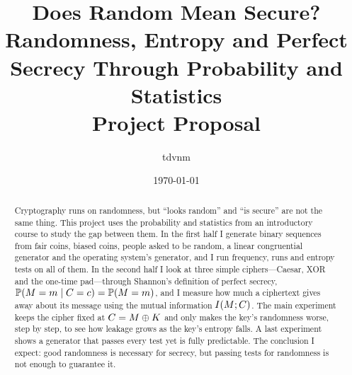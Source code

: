 \documentclass[11pt,a4paper]{article}
\title{Does Random Mean Secure?\\
\large Randomness, Entropy and Perfect Secrecy Through Probability and Statistics\\[0.5em]
\normalsize Project Proposal}
\author{tdvnm}
\date{\today}
\begin{document}
\maketitle

\begin{abstract}
Cryptography runs on randomness, but ``looks random'' and ``is secure'' are
not the same thing. This project uses the probability and statistics from an
introductory course to study the gap between them. In the first half I
generate binary sequences from fair coins, biased coins, people asked to be
random, a linear congruential generator and the operating system's
generator, and I run frequency, runs and entropy tests on all of them. In the second half I look at three simple ciphers---Caesar, XOR and the
one-time pad---through Shannon's definition of perfect secrecy,
$\mathbb{P}\!\left(M = m \mid C = c\right) = \mathbb{P}\!\left(M = m\right)$, and I measure how much a
ciphertext gives away about its message using the mutual information
$I\!\left(M ; C\right)$. The main experiment keeps the cipher fixed at
$C = M \oplus K$ and only makes the key's randomness worse, step by
step, to see how leakage grows as the key's entropy falls. A last experiment
shows a generator that passes every test yet is fully predictable. The
conclusion I expect: good randomness is necessary for secrecy, but passing
tests for randomness is not enough to guarantee it.
\end{abstract}

\setcounter{tocdepth}{1}
\tableofcontents
\vspace{1em}



%
%
%
%
%
%
%
%
%
%
%
%
%

\printbibliography
\end{document}
